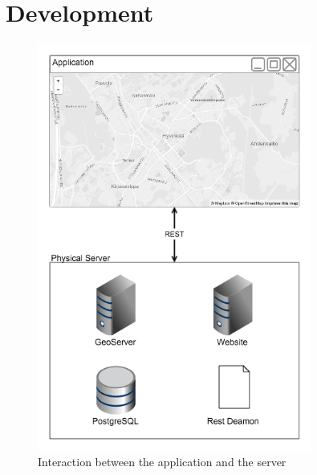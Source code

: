 
\section{Development}

\begin{figure}
  \centering
  \includegraphics[width=9cm]{img/c02-application/png/app-server-interact.png}
  \caption{Interaction between the application and the server}
\end{figure}

